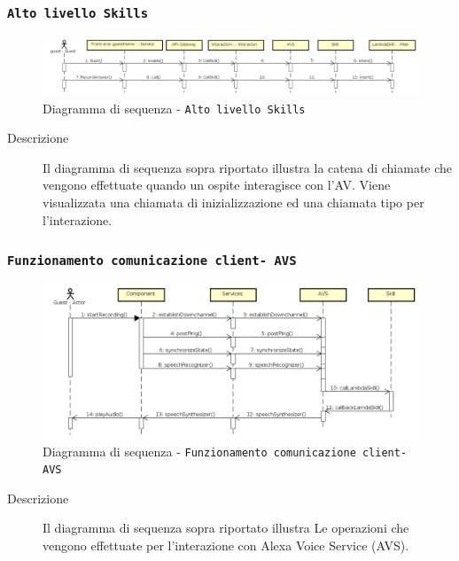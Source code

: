 \documentclass[../DefinizioneDiProdotto_v2.0.0.tex]{subfiles}
\begin{document}
\newpage
\subsubsection{\texttt{Alto livello Skills}}
\begin{figure}[!h]
	\centering
	\includegraphics[width=\textwidth]{DiagrammiSequenza/Back-End/SequenzaSkills.png}
	\caption{Diagramma di sequenza - \texttt{Alto livello Skills }}
\end{figure}
\begin{description}
	\item [Descrizione] Il diagramma di sequenza sopra riportato illustra la catena di chiamate che vengono effettuate quando un ospite interagisce con l'AV. Viene visualizzata una chiamata di inizializzazione ed una chiamata tipo per l'interazione.
\end{description}

\newpage
\subsubsection{\texttt{Funzionamento comunicazione client- AVS}}
\begin{figure}[!h]
	\centering
	\includegraphics[width=\textwidth]{DiagrammiSequenza/DiagrammaSequenzaGeneraleGuest.png}
	\caption{Diagramma di sequenza - \texttt{Funzionamento comunicazione client- AVS}}
\end{figure}
\begin{description}
	\item [Descrizione] Il diagramma di sequenza sopra riportato illustra Le operazioni che vengono effettuate per l'interazione con Alexa Voice Service (AVS).
\end{description}
\end{document}
